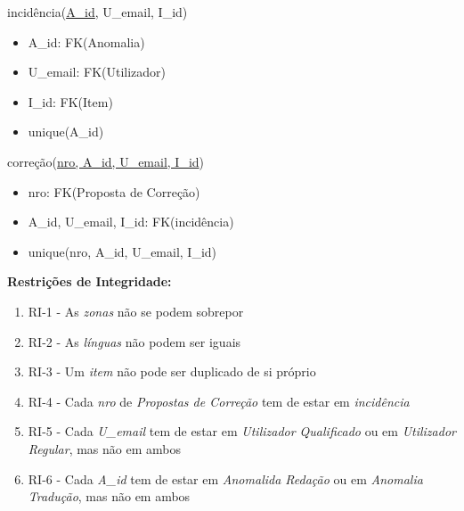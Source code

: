 \documentclass[12pt]{report}
\begin{document}
\begin{multicols}{2}
incidência(\underline{A\_id}, U\_email, I\_id)
    \begin{itemize}
    \item A\_id: FK(Anomalia)
    \item U\_email: FK(Utilizador)
    \item I\_id: FK(Item)
    \item unique(A\_id)                                             
    \end{itemize}


\vspace{5mm}


correção(\underline{nro, A\_id, U\_email, I\_id})
    \begin{itemize}
    \item nro: FK(Proposta de Correção)
    \item A\_id, U\_email, I\_id: FK(incidência)
    \item unique(nro, A\_id, U\_email, I\_id)              %
    \end{itemize}

\end{multicols}

\Large
\textbf{Restrições de Integridade: }\\

\normalsize
\begin{enumerate}
    \item RI-1 - As \textit{zonas} não se podem sobrepor
    \item RI-2 - As \textit{línguas} não podem ser iguais
    \item RI-3 - Um \textit{item} não pode ser duplicado de si próprio
    \item RI-4 - Cada \textit{nro} de \textit{Propostas de Correção} tem de estar em \textit{incidência}
    \item RI-5 - Cada \textit{U\_email} tem de estar em \textit{Utilizador Qualificado} ou em \textit{Utilizador Regular}, mas não em ambos
    \item RI-6 - Cada \textit{A\_id} tem de estar em \textit{Anomalida Redação} ou em \textit{Anomalia Tradução}, mas não em ambos
    
\end{enumerate}
\end{document}
